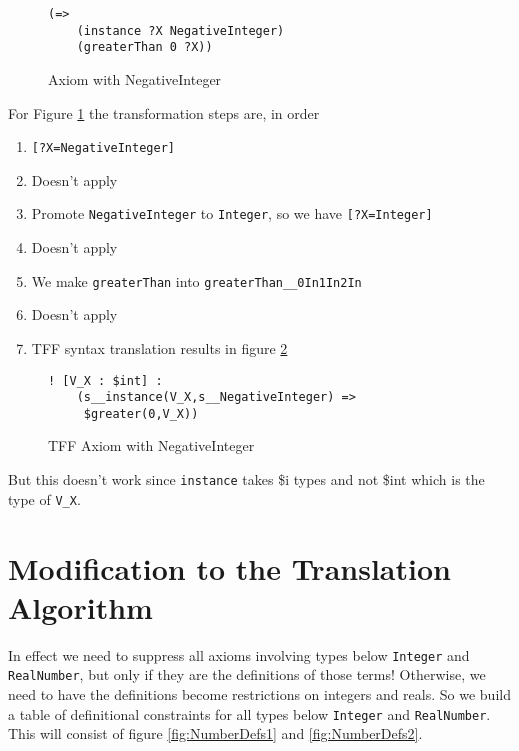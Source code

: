 \documentclass{article}
\begin{document}
\begin{figure}[H]
\begin{framed}
\begin{verbatim}
(=>
    (instance ?X NegativeInteger)
    (greaterThan 0 ?X))
\end{verbatim}
\end{framed}
\caption{Axiom with NegativeInteger}
\label{fig:NegInt}
\end{figure}

For Figure \ref{fig:NegInt} the transformation steps are, in order

\begin{enumerate}
\item \texttt{[?X=NegativeInteger]}
\item Doesn't apply
\item Promote \texttt{NegativeInteger} to \texttt{Integer}, so we have \texttt{[?X=Integer]}
\item Doesn't apply
\item We make \texttt{greaterThan} into \texttt{greaterThan\_\_0In1In2In}
\item Doesn't apply
\item TFF syntax translation results in figure \ref{fig:TFFNegInt}
\end{enumerate}

\begin{figure}[H]
\begin{framed}
\begin{verbatim}
! [V_X : $int] :
    (s__instance(V_X,s__NegativeInteger) =>
     $greater(0,V_X))
\end{verbatim}
\end{framed}
\caption{TFF Axiom with NegativeInteger}
\label{fig:TFFNegInt}
\end{figure}

But this doesn't work since \texttt{instance} takes \$i types and not \$int
which is the type of \texttt{V\_X}.  

\section{Modification to the Translation Algorithm}

In effect we need to suppress all axioms
involving types below \texttt{Integer} and \texttt{RealNumber}, but only
if they are the definitions of those terms!  Otherwise, we need to have the definitions
become restrictions on integers and reals.  So we build a table of definitional
constraints for all types below \texttt{Integer} and \texttt{RealNumber}.  This
will consist of figure \ref{fig:NumberDefs1} and \ref{fig:NumberDefs2}.
\end{document}
